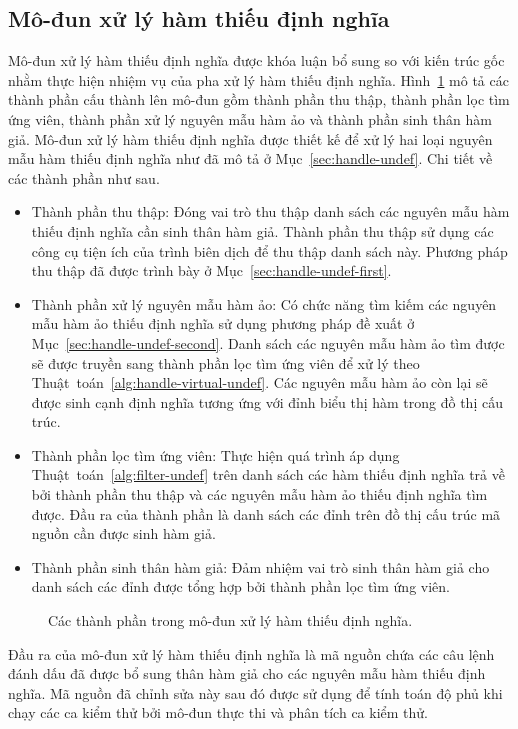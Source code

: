 \subsection{Mô-đun xử lý hàm thiếu định nghĩa}\label{sec:module-undef}
Mô-đun xử lý hàm thiếu định nghĩa được khóa luận bổ sung so với kiến trúc gốc nhằm thực hiện nhiệm vụ của pha xử lý hàm thiếu định nghĩa. Hình~\ref{fig:module-undef} mô tả các thành phần cấu thành lên mô-đun gồm thành phần thu thập, thành phần lọc tìm ứng viên, thành phần xử lý nguyên mẫu hàm ảo và thành phần sinh thân hàm giả. Mô-đun xử lý hàm thiếu định nghĩa được thiết kế để xử lý hai loại nguyên mẫu hàm thiếu định nghĩa như đã mô tả ở Mục~\ref{sec:handle-undef}. Chi tiết về các thành phần như sau.
\begin{itemize}
    \item Thành phần thu thập: Đóng vai trò thu thập danh sách các nguyên mẫu hàm thiếu định nghĩa cần sinh thân hàm giả. Thành phần thu thập sử dụng các công cụ tiện ích của trình biên dịch để thu thập danh sách này. Phương pháp thu thập đã được trình bày ở Mục~\ref{sec:handle-undef-first}.
    \item Thành phần xử lý nguyên mẫu hàm ảo: Có chức năng tìm kiếm các nguyên mẫu hàm ảo thiếu định nghĩa sử dụng phương pháp đề xuất ở Mục~\ref{sec:handle-undef-second}. Danh sách các nguyên mẫu hàm ảo tìm được sẽ được truyền sang thành phần lọc tìm ứng viên để xử lý theo Thuật~toán~\ref{alg:handle-virtual-undef}. Các nguyên mẫu hàm ảo còn lại sẽ được sinh cạnh định nghĩa tương ứng với đỉnh biểu thị hàm trong đồ thị cấu trúc.
    \item Thành phần lọc tìm ứng viên: Thực hiện quá trình áp dụng Thuật~toán~\ref{alg:filter-undef} trên danh sách các hàm thiếu định nghĩa trả về bởi thành phần thu thập và các nguyên mẫu hàm ảo thiếu định nghĩa tìm được. Đầu ra của thành phần là danh sách các đỉnh trên đồ thị cấu trúc mã nguồn cần được sinh hàm giả. 
    \item Thành phần sinh thân hàm giả: Đảm nhiệm vai trò sinh thân hàm giả cho danh sách các đỉnh được tổng hợp bởi thành phần lọc tìm ứng viên.
\end{itemize}

\begin{figure}[h]
    \centering
    
    \caption{Các thành phần trong mô-đun xử lý hàm thiếu định nghĩa.}
    \label{fig:module-undef}
\end{figure}

Đầu ra của mô-đun xử lý hàm thiếu định nghĩa là mã nguồn chứa các câu lệnh đánh dấu đã được bổ sung thân hàm giả cho các nguyên mẫu hàm thiếu định nghĩa. Mã nguồn đã chỉnh sửa này sau đó được sử dụng để tính toán độ phủ khi chạy các ca kiểm thử bởi mô-đun thực thi và phân tích ca kiểm thử.

